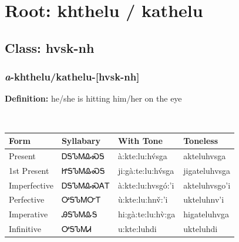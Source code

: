 \needspace{4in}
\section*{Root: khthelu / kathelu}
\nopagebreak
{}
\needspace{3in}
\subsection*{Class: hvsk-nh}
\nopagebreak
\needspace{2in}
\subsubsection*{\textit{a}{-}\textbf{khthelu/kathelu}{-}[hvsk-nh]}
\nopagebreak
\textbf{Definition: } he/she is hitting him/her on the eye
\\[0.5em]
\begin{tabularx}{\textwidth}{l X X X}%
\toprule%
\textbf{Form}&\textbf{Syllabary}&\textbf{With Tone}&\textbf{Toneless}\\%
\midrule%
Present&ᎠᎦᏖᎷᎲᏍᎦ&à:kte:lu:hv́sga&akteluhvsga\\%
1st Present&ᏥᎦᏖᎷᎲᏍᎦ&ji:gà:te:lu:hv́sga&jigateluhvsga\\%
Imperfective&ᎠᎦᏖᎷᎲᏍᎪᎢ&à:kte:lu:hvsgó:’i&akteluhvsgo’i\\%
Perfective&ᎤᎦᏖᎷᏅᎢ&ù:kte:lu:hnv̌:’i&ukteluhnv’i\\%
Imperative&ᎯᎦᏖᎷᎲᎦ&hi:gà:te:lu:hv̀:ga&higateluhvga\\%
Infinitive&ᎤᎦᏖᎷᏗ&u:kte:luhdi&ukteluhdi\\%
\bottomrule%
\end{tabularx}
\\[1em]